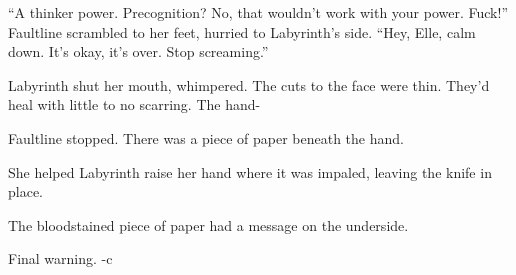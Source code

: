``A thinker power.  Precognition?  No, that wouldn't work with your power.  Fuck!''  Faultline scrambled to her feet, hurried to Labyrinth's side. ``Hey, Elle, calm down.  It's okay, it's over.  Stop screaming.''



Labyrinth shut her mouth, whimpered.  The cuts to the face were thin.  They'd heal with little to no scarring.  The hand-



Faultline stopped.  There was a piece of paper beneath the hand.



She helped Labyrinth raise her hand where it was impaled, leaving the knife in place.



The bloodstained piece of paper had a message on the underside.



Final warning.
-c





